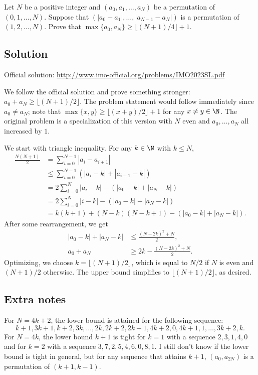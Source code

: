 Let $N$ be a positive integer and $(a_0, a_1, \ldots, a_N)$ be a permutation of $(0, 1, \ldots, N)$.
Suppose that $(|a_0 - a_1|, \ldots, |a_{N - 1} - a_N|)$ is a permutation of $(1, 2, \ldots, N)$.
Prove that $\max\{a_0, a_N\} \geq \lfloor (N + 1)/4 \rfloor + 1$.



\subsection*{Solution}

Official solution: \url{http://www.imo-official.org/problems/IMO2023SL.pdf}

We follow the official solution and prove something stronger: $a_0 + a_N \geq \lfloor (N + 1)/2 \rfloor$.
The problem statement would follow immediately since $a_0 \neq a_N$; note that $\max\{x, y\} \geq \lfloor (x + y)/2 \rfloor + 1$ for any $x \neq y \in \N$.
The original problem is a specialization of this version with $N$ even and $a_0, \ldots, a_N$ all increased by $1$.

We start with triangle inequality.
For any $k \in \N$ with $k \leq N$,
\begin{align*}
    \frac{N(N + 1)}{2}
    &= \sum_{i = 0}^{N - 1} |a_i - a_{i + 1}| \\
    &\leq \sum_{i = 0}^{N - 1} (|a_i - k| + |a_{i + 1} - k|) \\
    &= 2 \sum_{i = 0}^N |a_i - k| - (|a_0 - k| + |a_N - k|) \\
    &= 2 \sum_{i = 0}^N |i - k| - (|a_0 - k| + |a_N - k|) \\
    &= k(k + 1) + (N - k)(N - k + 1) - (|a_0 - k| + |a_N - k|).
\end{align*}
After some rearrangement, we get
\begin{align*}
    |a_0 - k| + |a_N - k| &\leq \frac{(N - 2k)^2 + N}{2}, \\
    a_0 + a_N &\geq 2k - \frac{(N - 2k)^2 + N}{2}.
\end{align*}
Optimizing, we choose $k = \lfloor (N + 1)/2 \rfloor$, which is equal to $N/2$ if $N$ is even and $(N + 1)/2$ otherwise.
The upper bound simplifies to $\lfloor (N + 1)/2 \rfloor$, as desired.



\subsection*{Extra notes}

For $N = 4k + 2$, the lower bound is attained for the following sequence:
\[ k + 1, 3k + 1, k + 2, 3k, \ldots, 2k, 2k + 2, 2k + 1, 4k + 2, 0, 4k + 1, 1, \ldots, 3k + 2, k. \]
For $N = 4k$, the lower bound $k + 1$ is tight for $k = 1$ with a sequence $2, 3, 1, 4, 0$ and for $k = 2$ with a sequence $3, 7, 2, 5, 4, 6, 0, 8, 1$.
I still don't know if the lower bound is tight in general, but for any sequence that attains $k + 1$, $(a_0, a_{2N})$ is a permutation of $(k + 1, k - 1)$.
